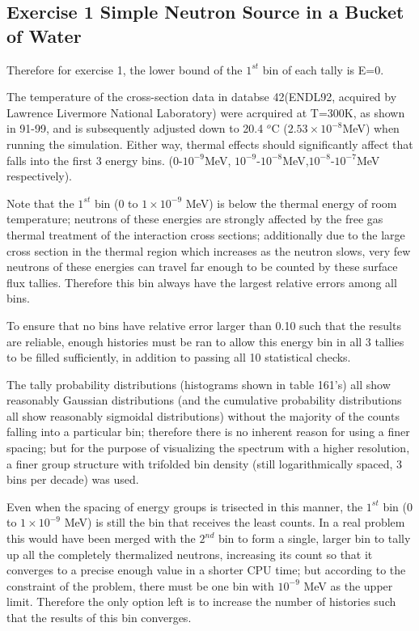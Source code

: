\documentclass[a4paper, 12pt]{article}
\begin{document}
\subsection{Exercise 1 Simple Neutron Source in a Bucket of Water}
Therefore for exercise 1, the lower bound of the $1^{st}$ bin of each tally is E=0.

The temperature of the cross-section data in databse 42(ENDL92, acquired by Lawrence Livermore National Laboratory) were acrquired at T=300K, as shown in 91-99, and is subsequently adjusted down to 20.4 ${}^{o}$C ($2.53 \times 10^{-8}$MeV) when running the simulation. Either way, thermal effects should significantly affect that falls into the first 3 energy bins. ($0$-$10^{-9}$MeV, $10^{-9}$-$10^{-8}$MeV,$10^{-8}$-$10^{-7}$MeV respectively).

Note that the $1^{st}$ bin ($0$ to $1\times 10^{-9}$ MeV) is below the thermal energy of room temperature; neutrons of these energies are strongly affected by the free gas thermal treatment of the interaction cross sections; additionally due to the large cross section in the thermal region which increases as the neutron slows, very few neutrons of these energies can travel far enough to be counted by these surface flux tallies. Therefore this bin always have the largest relative errors among all bins.

To ensure that no bins have relative error larger than 0.10 such that the results are reliable, enough histories must be ran to allow this energy bin in all 3 tallies to be filled sufficiently, in addition to passing all 10 statistical checks.

The tally probability distributions (histograms shown in table 161's) all show reasonably Gaussian distributions (and the cumulative probability distributions all show reasonably sigmoidal distributions) without the majority of the counts falling into a particular bin; therefore there is no inherent reason for using a finer spacing; but for the purpose of visualizing the spectrum with a higher resolution, a finer group structure with trifolded bin density (still logarithmically spaced, 3 bins per decade) was used.

Even when the spacing of energy groups is trisected in this manner, the $1^{st}$ bin ($0$ to $1\times 10^{-9}$ MeV) is still the bin that receives the least counts. In a real problem this would have been merged with the $2^{nd}$ bin to form a single, larger bin to tally up all the completely thermalized neutrons, increasing its count so that it converges to a precise enough value in a shorter CPU time; but according to the constraint of the problem, there must be one bin with ${10^{-9}}$ MeV as the upper limit. Therefore the only option left is to increase the number of histories such that the results of this bin converges.
\end{document}
